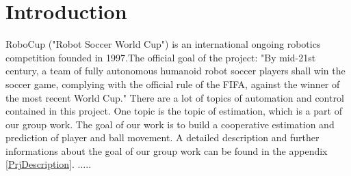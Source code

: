 
\chapter{Introduction}
RoboCup ("Robot Soccer World Cup") is an international ongoing robotics competition founded in 1997.The official goal of the project: "By mid-21st century, a team of fully autonomous humanoid robot soccer players shall win the soccer game, complying with the official rule of the FIFA, against the winner of the most recent World Cup." \cite{wwwRoboCup}
There are a lot of topics of automation and control contained in this project. One topic is the topic of estimation, which is a part of our group work. The goal of our work is to build a cooperative estimation and prediction of player and ball movement. A detailed description and further informations about the goal of our group work can be found in the appendix \ref{PrjDescription}.
.....



